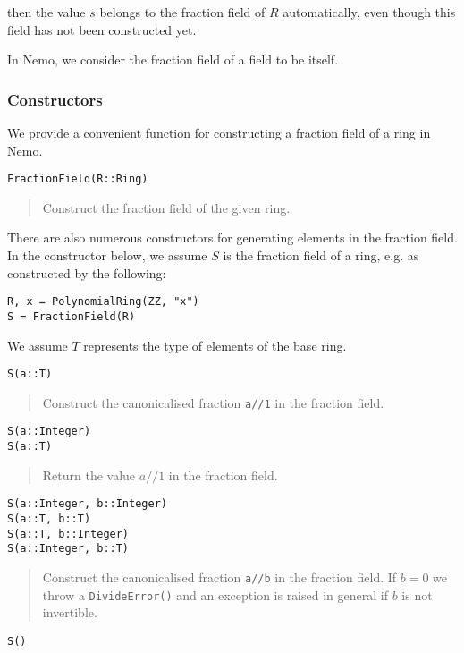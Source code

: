 \documentclass[a4paper,10pt]{article}
\newcommand{\code}{\lstinline}
\newcommand{\desc}[1]{\vspace{-3mm}\begin{quote}#1\end{quote}}
\begin{document}
then the value $s$ belongs to the fraction field of $R$ automatically, even
though this field has not been constructed yet.

In Nemo, we consider the fraction field of a field to be itself.

\subsubsection{Constructors}

We provide a convenient function for constructing a fraction field of a ring in
Nemo.

\begin{lstlisting}
FractionField(R::Ring)
\end{lstlisting}

\desc{Construct the fraction field of the given ring.}

There are also numerous constructors for generating elements in the fraction
field. In the constructor below, we assume $S$ is the fraction field of a ring,
e.g. as constructed by the following:

\begin{lstlisting}
R, x = PolynomialRing(ZZ, "x")
S = FractionField(R)
\end{lstlisting}

We assume $T$ represents the type of elements of the base ring.

\begin{lstlisting}
S(a::T)
\end{lstlisting}

\desc{Construct the canonicalised fraction \code{a//1} in the fraction field.}

\begin{lstlisting}
S(a::Integer)
S(a::T)
\end{lstlisting}

\desc{Return the value $a//1$ in the fraction field.}

\begin{lstlisting}
S(a::Integer, b::Integer)
S(a::T, b::T)
S(a::T, b::Integer)
S(a::Integer, b::T)
\end{lstlisting}

\desc{Construct the canonicalised fraction \code{a//b} in the fraction field. If
$b = 0$ we throw a \code{DivideError()} and an exception is raised in general
if $b$ is not invertible.}

\begin{lstlisting}
S()
\end{lstlisting}
\end{document}
